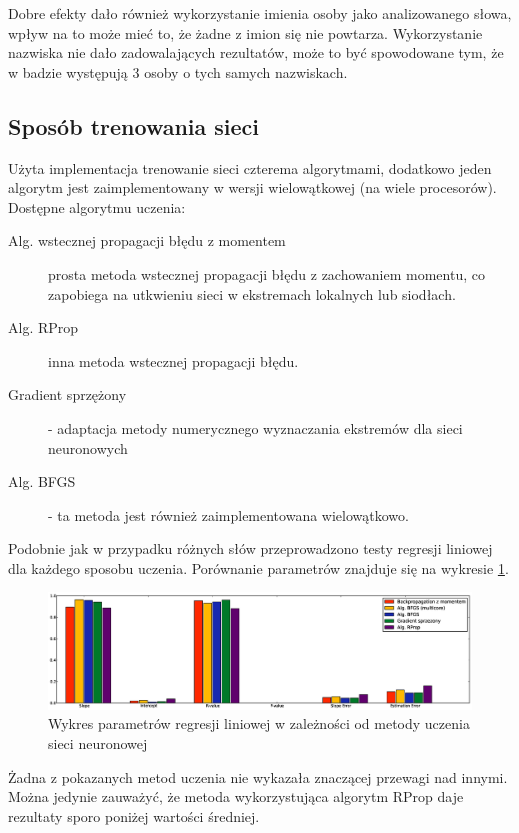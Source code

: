 \documentclass[a4paper]{article}
\begin{document}
Dobre efekty dało również wykorzystanie imienia osoby jako analizowanego słowa,
wpływ na to może mieć to, że żadne z imion się nie powtarza. Wykorzystanie
nazwiska nie dało zadowalających rezultatów, może to być spowodowane tym, że w
badzie występują 3 osoby o tych samych nazwiskach.

\subsection{Sposób trenowania sieci}

Użyta implementacja trenowanie sieci czterema algorytmami, dodatkowo jeden
algorytm jest zaimplementowany w wersji wielowątkowej (na wiele procesorów).
Dostępne algorytmu uczenia:
\begin{description}
    \item[Alg. wstecznej propagacji błędu z momentem] prosta metoda wstecznej
        propagacji błędu z zachowaniem momentu, co zapobiega na utkwieniu sieci
        w ekstremach lokalnych lub siodłach.
    \item[Alg. RProp] inna metoda wstecznej propagacji błędu.
    \item[Gradient sprzężony] - adaptacja metody numerycznego wyznaczania
        ekstremów dla sieci neuronowych
    \item[Alg. BFGS] - ta metoda jest również zaimplementowana wielowątkowo.

\end{description}
Podobnie jak w przypadku różnych słów przeprowadzono testy regresji liniowej
dla każdego sposobu uczenia. Porównanie parametrów znajduje się na wykresie
\ref{fig:train}.


\begin{figure}[h!]
    \includegraphics[width=\textwidth]{training_network_reggresion}
    \caption{Wykres parametrów regresji liniowej w zależności od metody uczenia
    sieci neuronowej}
    \label{fig:train}
\end{figure}

Żadna z pokazanych metod uczenia nie wykazała znaczącej przewagi nad innymi.
Można jedynie zauważyć, że metoda wykorzystująca algorytm RProp daje rezultaty
sporo poniżej wartości średniej.
\end{document}
